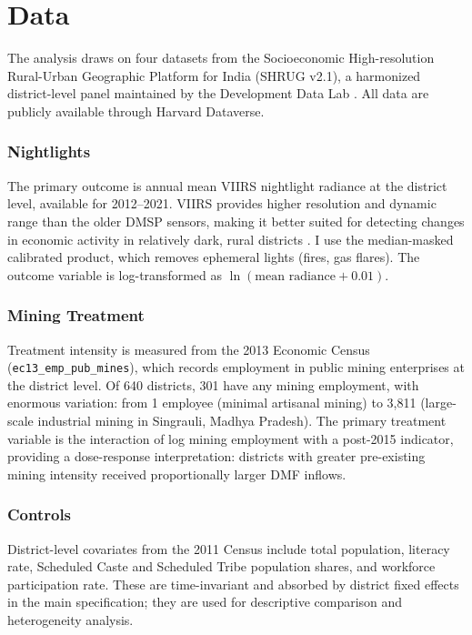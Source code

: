 \documentclass[12pt]{article}
\begin{document}
\section{Data}

The analysis draws on four datasets from the Socioeconomic High-resolution Rural-Urban Geographic Platform for India (SHRUG v2.1), a harmonized district-level panel maintained by the Development Data Lab \citep{asher2021development}. All data are publicly available through Harvard Dataverse.

\subsubsection*{Nightlights} The primary outcome is annual mean VIIRS nightlight radiance at the district level, available for 2012--2021. VIIRS provides higher resolution and dynamic range than the older DMSP sensors, making it better suited for detecting changes in economic activity in relatively dark, rural districts \citep{gibson2021night}. I use the median-masked calibrated product, which removes ephemeral lights (fires, gas flares). The outcome variable is log-transformed as $\ln(\text{mean radiance} + 0.01)$.

\subsubsection*{Mining Treatment} Treatment intensity is measured from the 2013 Economic Census (\texttt{ec13\_emp\_pub\_mines}), which records employment in public mining enterprises at the district level. Of 640 districts, 301 have any mining employment, with enormous variation: from 1 employee (minimal artisanal mining) to 3,811 (large-scale industrial mining in Singrauli, Madhya Pradesh). The primary treatment variable is the interaction of log mining employment with a post-2015 indicator, providing a dose-response interpretation: districts with greater pre-existing mining intensity received proportionally larger DMF inflows.

\subsubsection*{Controls} District-level covariates from the 2011 Census include total population, literacy rate, Scheduled Caste and Scheduled Tribe population shares, and workforce participation rate. These are time-invariant and absorbed by district fixed effects in the main specification; they are used for descriptive comparison and heterogeneity analysis.
\end{document}
